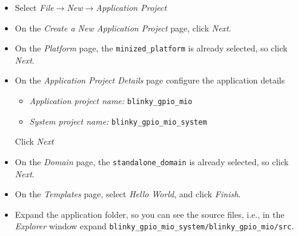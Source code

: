 \begin{enumerate}
\begin{itemize}
\item Select \emph{File}$\rightarrow$\emph{New}$\rightarrow$\emph{Application Project}
\item On the \emph{Create a New Application Project} page, click \emph{Next}.
\item On the \emph{Platform} page, the \verb+minized_platform+ is already 
selected, so click \emph{Next}.
\item On the \emph{Application Project Details} page configure the 
application details
\begin{itemize}
\item \emph{Application project name:} \texttt{blinky\_gpio\_mio}
\item \emph{System project name:} \texttt{blinky\_gpio\_mio\_system}
\end{itemize}
Click \emph{Next}
\item On the \emph{Domain} page, the \verb+standalone_domain+ is already 
selected, so click \emph{Next}.
\item On the \emph{Templates} page, select \emph{Hello World}, and
click \emph{Finish}.

\item Expand the application folder, so you can see the source files, i.e., in
the \emph{Explorer} window expand
\verb+blinky_gpio_mio_system/blinky_gpio_mio/src+.


\end{itemize}
\end{enumerate}

